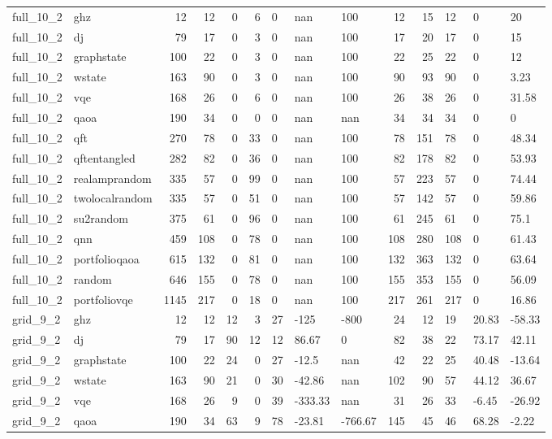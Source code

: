 \begin{longtable}{llrrrrlllrrlll}
full\_10\_2 & ghz & 12 & 12 & 0 & 6 & 0 & nan & 100 & 12 & 15 & 12 & 0 & 20 \\
full\_10\_2 & dj & 79 & 17 & 0 & 3 & 0 & nan & 100 & 17 & 20 & 17 & 0 & 15 \\
full\_10\_2 & graphstate & 100 & 22 & 0 & 3 & 0 & nan & 100 & 22 & 25 & 22 & 0 & 12 \\
full\_10\_2 & wstate & 163 & 90 & 0 & 3 & 0 & nan & 100 & 90 & 93 & 90 & 0 & 3.23 \\
full\_10\_2 & vqe & 168 & 26 & 0 & 6 & 0 & nan & 100 & 26 & 38 & 26 & 0 & 31.58 \\
full\_10\_2 & qaoa & 190 & 34 & 0 & 0 & 0 & nan & nan & 34 & 34 & 34 & 0 & 0 \\
full\_10\_2 & qft & 270 & 78 & 0 & 33 & 0 & nan & 100 & 78 & 151 & 78 & 0 & 48.34 \\
full\_10\_2 & qftentangled & 282 & 82 & 0 & 36 & 0 & nan & 100 & 82 & 178 & 82 & 0 & 53.93 \\
full\_10\_2 & realamprandom & 335 & 57 & 0 & 99 & 0 & nan & 100 & 57 & 223 & 57 & 0 & 74.44 \\
full\_10\_2 & twolocalrandom & 335 & 57 & 0 & 51 & 0 & nan & 100 & 57 & 142 & 57 & 0 & 59.86 \\
full\_10\_2 & su2random & 375 & 61 & 0 & 96 & 0 & nan & 100 & 61 & 245 & 61 & 0 & 75.1 \\
full\_10\_2 & qnn & 459 & 108 & 0 & 78 & 0 & nan & 100 & 108 & 280 & 108 & 0 & 61.43 \\
full\_10\_2 & portfolioqaoa & 615 & 132 & 0 & 81 & 0 & nan & 100 & 132 & 363 & 132 & 0 & 63.64 \\
full\_10\_2 & random & 646 & 155 & 0 & 78 & 0 & nan & 100 & 155 & 353 & 155 & 0 & 56.09 \\
full\_10\_2 & portfoliovqe & 1145 & 217 & 0 & 18 & 0 & nan & 100 & 217 & 261 & 217 & 0 & 16.86 \\
grid\_9\_2 & ghz & 12 & 12 & 12 & 3 & 27 & -125 & -800 & 24 & 12 & 19 & 20.83 & -58.33 \\
grid\_9\_2 & dj & 79 & 17 & 90 & 12 & 12 & 86.67 & 0 & 82 & 38 & 22 & 73.17 & 42.11 \\
grid\_9\_2 & graphstate & 100 & 22 & 24 & 0 & 27 & -12.5 & nan & 42 & 22 & 25 & 40.48 & -13.64 \\
grid\_9\_2 & wstate & 163 & 90 & 21 & 0 & 30 & -42.86 & nan & 102 & 90 & 57 & 44.12 & 36.67 \\
grid\_9\_2 & vqe & 168 & 26 & 9 & 0 & 39 & -333.33 & nan & 31 & 26 & 33 & -6.45 & -26.92 \\
grid\_9\_2 & qaoa & 190 & 34 & 63 & 9 & 78 & -23.81 & -766.67 & 145 & 45 & 46 & 68.28 & -2.22 \\

\end{longtable}
